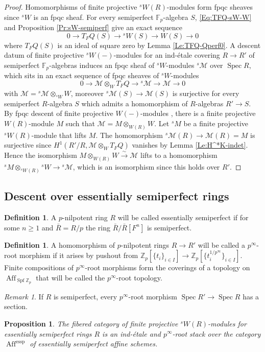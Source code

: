 \documentclass[a4paper,11pt]{amsart}
\theoremstyle{plain}
\newtheorem{Prop}[equation]{Proposition}
\theoremstyle{definition}
\newtheorem{Defn}[equation]{Definition}
\theoremstyle{remark}
\newtheorem{Remark}[equation]{Remark}
\newcommand{\bPr}{\begin{Prop}}
\newcommand{\ePr}{\end{Prop}}
\newcommand{\bDe}{\begin{Defn}}
\newcommand{\eDe}{\end{Defn}}
\newcommand{\bRe}{\begin{Remark}}
\newcommand{\eRe}{\end{Remark}}
\newcommand{\bproof}{\begin{proof}}
\newcommand{\eproof}{\end{proof}}
\numberwithin{equation}{section}
\newcommand{\MMM}{\mathcal{M}}
\newcommand{\FF}{{\mathbb{F}}}
\newcommand{\ZZ}{{\mathbb{Z}}}
\DeclareMathOperator{\essemiperf}{essp}
\DeclareMathOperator{\Aff}{Aff}
\DeclareMathOperator{\Spf}{Spf}
\DeclareMathOperator{\Spec}{Spec}
\newcommand{\sM}{{}^{s\!}M}
\newcommand{\sMMM}{{}^{s}\!\MMM}
\newcommand{\sW}{{}^sW}
\begin{document}
\bproof
Homomorphisms of finite projective $\sW(R)$-modules form fpqc sheaves since $\sW$ is an fpqc sheaf. For every semiperfect $\FF_p$-algebra $S$, \eqref{Eq:TFQ-sW-W} and Proposition \ref{Pr:sW-semiperf} give an exact sequence
\[
0\to T_FQ(S)\to \sW(S)\to W(S)\to 0
\] 
where $T_FQ(S)$ is an ideal of square zero by Lemma \ref{Le:TFQ-Qperf0}.
A descent datum of finite projective $\sW(-)$-modules for an ind-\'etale covering $R\to R'$ of semiperfect $\FF_p$-algebras induces an fpqc sheaf of $\sW$-modules $\sMMM$ over $\Spec R$, which sits in an exact sequence of fpqc sheaves of $\sW$-modules
\[
0\to\MMM\otimes_{W}T_FQ\to\sMMM\to\MMM\to 0
\]
with $\MMM=\sMMM\otimes_{\sW}W$, moreover $\sMMM(S)\to\MMM(S)$ is surjective for every semiperfect $R$-algebra $S$ which admits a homomorphism of $R$-algebras $R'\to S$. By fpqc descent of finite projective $W(-)$-modules \cite[Corollary 34]{Zink:The-display}, there is a finite projective $W(R)$-module $M$ such that $\MMM=M\otimes_{W(R)}W$. Let $\sM$ be a finite projective $\sW(R)$-module that lifts $M$. 
The homomorphism $\sMMM(R)\to\MMM(R)=M$ is surjective since $H^1(R'/R,\MMM\otimes_{W}T_FQ)$ vanishes by Lemma \ref{Le:H^*K-indet}. 
Hence the isomorphism $M\otimes_{W(R)}W\xrightarrow\sim\MMM$ lifts to a homomorphism $\sM\otimes_{\sW(R)}\sW\to\sMMM$, which is an isomorphism since this holds over $R'$. 
\eproof

\subsection{Descent over essentially semiperfect rings}

\bDe
\label{De:essemiperf}
A $p$-nilpotent ring $R$ will be called essentially semiperfect if for some $n\ge 1$ and $\bar R=R/p$ the ring  $\bar R/\bar R[F^n]$ is semiperfect.
\eDe

\bDe
\label{De:proot}
A homomorphism of $p$-nilpotent rings $R\to R'$ will be called a $p^\infty$-root morphism if it arises by pushout from  $\ZZ_p[\{t_i\}_{i\in I}]\to\ZZ_p[\{t_i^{1/p^\infty}\}_{i\in I}]$. Finite compositions of $p^\infty$-root morphisms form the coverings of a topology on $\Aff_{\Spf\ZZ_p}$ that will be called the $p^\infty$-root topology.
\eDe

\bRe
\label{Re:proot-semiperf}
If $R$ is semiperfect, every $p^\infty$-root morphism $\Spec R'\to\Spec R$ has a section.
\eRe

\bPr
\label{Pr:Descent-LF(sW)-essemiperf}
The fibered category of finite projective $\sW(R)$-modules for essentially semiperfect rings $R$ is an ind-\'etale and $p^\infty$-root stack over the category $\Aff^{\essemiperf}$ of essentially semiperfect  affine schemes.
\ePr
\end{document}
